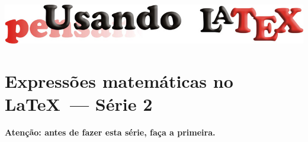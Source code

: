 \documentclass[a4paper,10pt,twocolumn,landscape]{article}
\begin{document}
	\begin{center}\includegraphics[width=0.8\columnwidth]{../figuras/LogotipoCursoLaTeX_v2}\end{center}

	\section*{Expressões matemáticas no \LaTeX\ --- Série 2}	
	\begin{center}
		\bfseries\color{red}
		Atenção: antes de fazer esta série, faça a primeira.
	\end{center}
		
\end{document}
